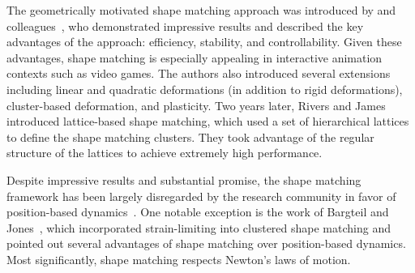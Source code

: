 \documentclass[review]{acmsiggraph}
\begin{document}


The geometrically motivated shape matching approach was introduced by \Mueller and 
colleagues~, who demonstrated impressive results and 
described the key advantages of the approach: efficiency, stability, and controllability.
Given these advantages, shape matching is especially appealing in interactive animation contexts such as
video games.  The authors also introduced several extensions including linear and quadratic deformations 
(in addition to rigid deformations), cluster-based deformation, and plasticity.  
%
Two years later, Rivers and James~ introduced lattice-based shape matching,
which used a set of hierarchical lattices to define the shape matching clusters.  They took advantage
of the regular structure of the lattices to achieve extremely high performance.  

Despite impressive results and substantial promise,
the shape matching framework has been largely disregarded by the research community in favor of position-based
dynamics~\cite{Mueller:2007:PBD,Bender:2013:PBM,Bender:2014:ASO,Macklin:2014:UPP}.  One notable exception is
the work of Bargteil and Jones~, which incorporated strain-limiting into clustered shape matching
and pointed out several advantages of shape matching over position-based dynamics.  Most significantly, shape matching respects Newton's 
laws of motion.
\end{document}
